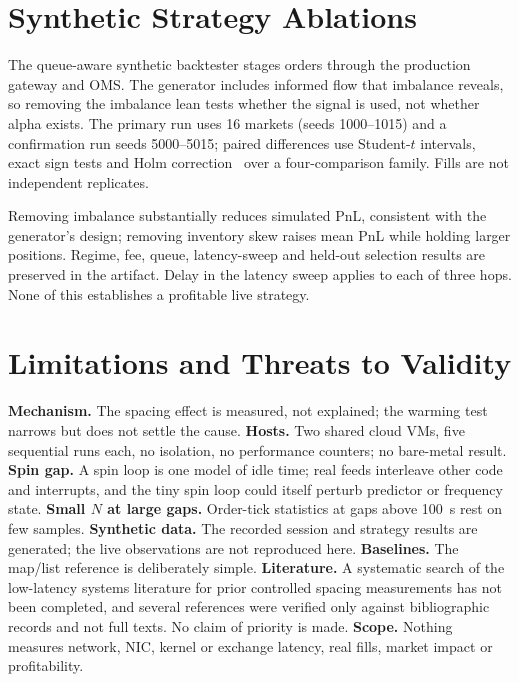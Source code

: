 \documentclass[conference]{IEEEtran}
\begin{document}
\section{Synthetic Strategy Ablations}
The queue-aware synthetic backtester stages orders through the production gateway and OMS. The generator includes informed flow that imbalance reveals, so removing the imbalance lean tests whether the signal is used, not whether alpha exists. The primary run uses 16 markets (seeds 1000--1015) and a confirmation run seeds 5000--5015; paired differences use Student-$t$ intervals, exact sign tests and Holm correction~\cite{holm1979} over a four-comparison family. Fills are not independent replicates.
\begin{table}[t]\centering\caption{Primary paired synthetic PnL differences versus the base. CI is Student-$t$ for mean difference; $p$ is Holm-adjusted exact sign-test probability. Source: \texttt{paired\_statistics.csv}.}\resizebox{\columnwidth}{!}{}\end{table}
Removing imbalance substantially reduces simulated PnL, consistent with the generator's design; removing inventory skew raises mean PnL while holding larger positions. Regime, fee, queue, latency-sweep and held-out selection results are preserved in the artifact. Delay in the latency sweep applies to each of three hops. None of this establishes a profitable live strategy.

\section{Limitations and Threats to Validity}\label{sec:limits}
\textbf{Mechanism.} The spacing effect is measured, not explained; the warming test narrows but does not settle the cause. \textbf{Hosts.} Two shared cloud VMs, five sequential runs each, no isolation, no performance counters; no bare-metal result. \textbf{Spin gap.} A spin loop is one model of idle time; real feeds interleave other code and interrupts, and the tiny spin loop could itself perturb predictor or frequency state. \textbf{Small $N$ at large gaps.} Order-tick statistics at gaps above 100~\textmu s rest on few samples. \textbf{Synthetic data.} The recorded session and strategy results are generated; the live observations are not reproduced here. \textbf{Baselines.} The map/list reference is deliberately simple. \textbf{Literature.} A systematic search of the low-latency systems literature for prior controlled spacing measurements has not been completed, and several references were verified only against bibliographic records and not full texts. No claim of priority is made. \textbf{Scope.} Nothing measures network, NIC, kernel or exchange latency, real fills, market impact or profitability.
\end{document}

